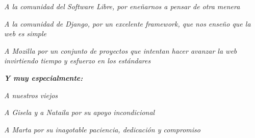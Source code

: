 \newpage
\thispagestyle{empty}
\begin{flushright}


{\it A la comunidad del Software Libre, por eneñarnos a pensar de otra
menera}\par

{\it A la comunidad de Django, por un excelente framework, que nos enseño que 
la web es simple }\par
{\it A Mozilla por un conjunto de proyectos que intentan hacer avanzar la web
invirtiendo tiempo y esfuerzo en los estándares }\par
\par
\par
\vfill
{\it{\bf Y muy especialmente:}}\par
{\it A nuestros viejos}\par
{\it A Gisela y a Nataila por su apoyo incondicional}\par
{\it A Marta por su inagotable paciencia, dedicación y compromiso}\par


\end{flushright}
\newpage